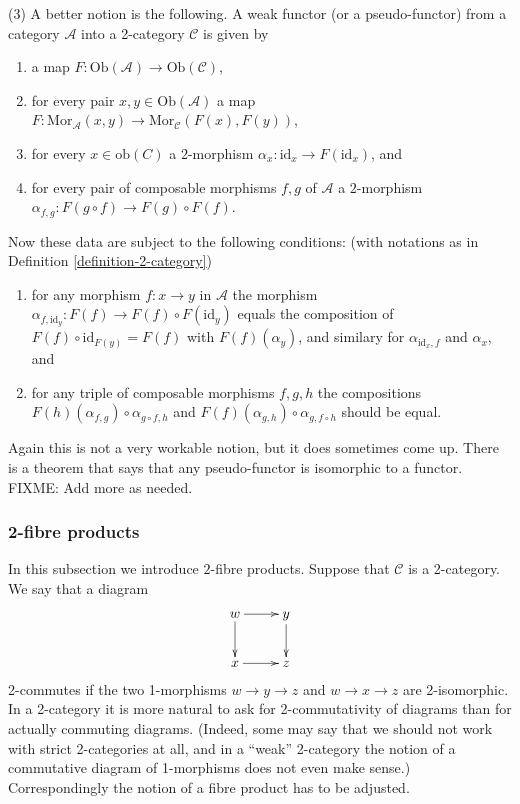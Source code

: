 \begin{remarks}
\smallskip\noindent
(3) A better notion is the following. A weak functor (or a pseudo-functor)
from a category $\mathcal{A}$ into a 2-category $\mathcal{C}$ is given by 
\begin{enumerate}
\item a map $F : \text{Ob}(\mathcal{A}) \to \text{Ob}(\mathcal{C})$,
\item for every pair $x,y\in \text{Ob}(\mathcal{A})$ a map
$F : \text{Mor}_{\mathcal{A}}(x,y) \to  \text{Mor}_{\mathcal{C}}(F(x),F(y))$,
\item for every $x\in \text{ob}(C)$ a $2$-morphism
$\alpha_x : \text{id}_x \to F(\text{id}_{x})$, and
\item for every pair of composable morphisms $f,g$ of $\mathcal{A}$ a 
$2$-morphism $\alpha_{f,g} : F(g \circ f) \to F(g) \circ F(f)$.
\end{enumerate}
Now these data are subject to the following conditions:
(with notations as in Definition \ref{definition-2-category})
\begin{enumerate}
\item for any morphism $f : x \to y$ in $\mathcal{A}$ the morphism
$\alpha_{f,\text{id}_y} : F(f) \to F(f) \circ F(\text{id}_y)$
equals the composition of $F(f) \circ \text{id}_{F(y)} = F(f)$ with
$F(f)(\alpha_y)$, and similary for $\alpha_{\text{id}_x,f}$ and
$\alpha_x$, and
\item for any triple of composable morphisms $f,g,h$ the
compositions $F(h)(\alpha_{f,g}) \circ \alpha_{g\circ f, h}$ and
$F(f)(\alpha_{g,h}) \circ \alpha_{g,f\circ h}$ should be equal.
\end{enumerate}
Again this is not a very workable notion, but it does sometimes come up.
There is a theorem that says that any pseudo-functor is isomorphic to
a functor. FIXME: Add more as needed.
\end{remarks}

\subsubsection{2-fibre products}
\label{subsubsection-2-fibre-products}

\noindent
In this subsection we introduce $2$-fibre products. Suppose that $\mathcal{C}$
is a 2-category. We say that a diagram
$$
\xymatrix{
w \ar[r] \ar[d] & y \ar[d] \\
x \ar[r] & z }
$$
2-commutes if the two 1-morphisms $w \to y \to z$ and $w \to x \to z$ are
2-isomorphic. In a 2-category it is more natural to ask for 2-commutativity 
of diagrams than for actually commuting diagrams. (Indeed, some may say that
we should not work with strict 2-categories at all, and in a ``weak''
2-category the notion of a commutative diagram of 1-morphisms does not even
make sense.) Correspondingly the notion of a fibre product has to be adjusted.

